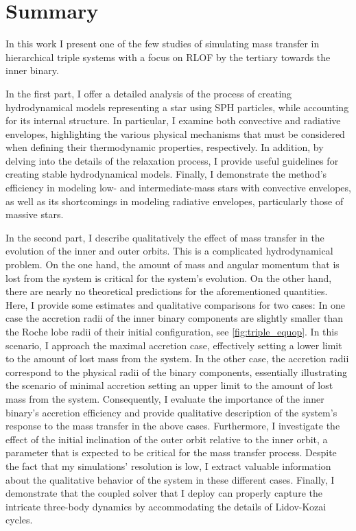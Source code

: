 \section{Summary}

In this work I present one of the few studies of simulating mass transfer in hierarchical triple systems with a focus on RLOF by the tertiary towards the inner binary. 

In the first part, I offer a detailed analysis of the process of creating hydrodynamical models representing a star using SPH particles, while accounting for its internal structure. In particular, I examine both convective and radiative envelopes, highlighting the various physical mechanisms that must be considered when defining their thermodynamic properties, respectively. In addition, by delving into the details of the relaxation process, I provide useful guidelines for creating stable hydrodynamical models. Finally, I demonstrate the method's efficiency in modeling low- and intermediate-mass stars with convective envelopes, as well as its shortcomings in modeling radiative envelopes, particularly those of massive stars.

In the second part, I describe qualitatively the effect of mass transfer in the evolution of the inner and outer orbits. This is a complicated hydrodynamical problem. On the one hand, the amount of mass and angular momentum that is lost from the system is critical for the system's evolution. On the other hand, there are nearly no theoretical predictions for the aforementioned quantities. Here, I provide some estimates and qualitative comparisons for two cases: In one case the accretion radii of the inner binary components are slightly smaller than the Roche lobe radii of their initial configuration, see \cref{fig:triple_equop}. In this scenario, I approach the maximal accretion case, effectively setting a lower limit to the amount of lost mass from the system. In the other case, the accretion radii correspond to the physical radii of the binary components, essentially illustrating the scenario of minimal accretion setting an upper limit to the amount of lost mass from the system. Consequently, I evaluate the importance of the inner binary's accretion efficiency and provide qualitative description of the system's response to the mass transfer in the above cases. Furthermore, I investigate the effect of the initial inclination of the outer orbit relative to the inner orbit, a parameter that is expected to be critical for the mass transfer process. Despite the fact that my simulations' resolution is low, I extract valuable information about the qualitative behavior of the system in these different cases. Finally, I demonstrate that the coupled solver that I deploy can properly capture the intricate three-body dynamics by accommodating the details of Lidov-Kozai cycles. 

